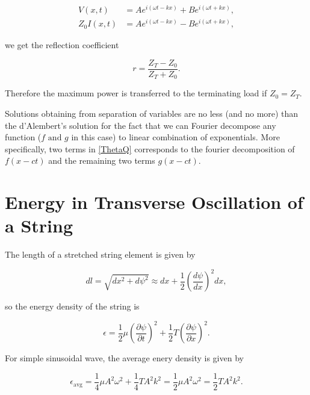 \documentclass[a4paper,12pt]{report}
\begin{document}
{\begin{equation}
	\begin{aligned} 
	V(x,t) &= Ae^{i (\omega t-kx) }  + Be^{i (\omega t+kx)}, \\
	Z_0 I(x,t) &= Ae^{i(\omega t-kx)}  - Be^{i(\omega t+kx)}, 
	\end{aligned}       
\end{equation}

we get the reflection coefficient 

\begin{equation}
	r = \frac{Z_{T}- Z_0 }{Z_{T}+Z_0  }. 
\end{equation}

Therefore the maximum power is transferred to the terminating load if \(Z_0 = Z_{T} \). 

} 



Solutions obtaining from separation of variables are no less (and no more) than the d'Alembert's solution for the fact that we can Fourier decompose any function (\(f \text { and } g\) in this case) to linear combination of exponentials. More specifically, two terms in \cref{ThetaQ} corresponds to the fourier decomposition of \(f(x-ct)\) and the remaining two terms \(g(x-ct)\).  



\section{Energy in Transverse Oscillation of a String}

The length of a stretched string element is given by 

\begin{equation}
	dl = \sqrt{dx^2+d\psi ^2} \approx dx + \frac{1}{2}\left( \frac{d\psi }{dx}  \right)^2dx ,
\end{equation}

so the energy density of the string is 

\begin{equation}
	\epsilon  = \frac{1}{2} \mu \left( \frac{\partial \psi }{\partial t}  \right)^2 + \frac{1}{2} T \left( \frac{\partial \psi }{\partial x}  \right)^2.
\end{equation}

For simple sinusoidal wave, the average enery density is given by 

\begin{equation}
	\epsilon_{\text{avg} }  = \frac{1}{4}\mu A^2\omega ^2+\frac{1}{4}T A^2k^2 = \frac{1}{2}\mu A^2\omega ^2 = \frac{1}{2} TA^2k^2. 
\end{equation}
\end{document}
